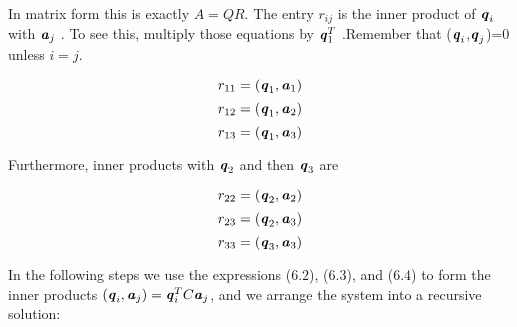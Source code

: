 \begin{flushleft}
	In matrix form this is exactly $A=QR$. The entry $r_{ij}$ is the inner product of $\textbf{\textit{q}}_{i}$ with $\textbf{\textit{a}}_{j}$ . To see this, multiply those equations by $\textbf{\textit{q}}^T_1$ .Remember that ($\textbf{\textit{q}}_{i}$,$\textbf{\textit{q}}_{j}$)=$0$ unless $i =j$.
\end{flushleft}

$$r_{11}=(\textbf{\textit{q}}_{1},\textbf{\textit{a}}_{1})$$
$$r_{12}=(\textbf{\textit{q}}_{1},\textbf{\textit{a}}_{2})$$
$$r_{13}=(\textbf{\textit{q}}_{1},\textbf{\textit{a}}_{3})$$

\begin{flushleft}
	Furthermore, inner products with $\textbf{\textit{q}}_{2}$ and then $\textbf{\textit{q}}_{3}$ are
\end{flushleft}

$$r_{22}=(\textbf{\textit{q}}_{2},\textbf{\textit{a}}_{2})$$
$$r_{23}=(\textbf{\textit{q}}_{2},\textbf{\textit{a}}_{3})$$
$$r_{33}=(\textbf{\textit{q}}_{3},\textbf{\textit{a}}_{3})$$

\begin{flushleft}
	In the following steps we use the expressions ($6.2$), ($6.3$), and ($6.4$) to form the inner products $ (\textbf{\textit{q}}_{i},\textbf{\textit{a}}_{j})=\textbf{\textit{q}}^T_{i}C\textbf{\textit{a}}_{j}$, and we arrange the system into a recursive solution:
\end{flushleft}


